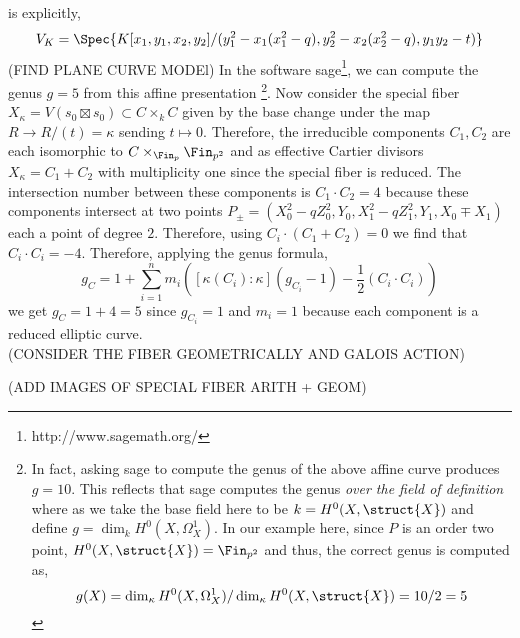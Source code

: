 is explicitly,
\[ V_K = \Spec{K[x_1, y_1, x_2, y_2]/(y_1^2 - x_1(x_1^2 - q), y_2^2 - x_2(x_2^2 - q), y_1 y_2 - t)} \]
(FIND PLANE CURVE MODEl)
In the software sage\footnote{http://www.sagemath.org/}, we can compute the genus $g = 5$ from this affine presentation \footnote{In fact, asking sage to compute the genus of the above affine curve produces $g = 10$. This reflects that sage computes the genus \textit{over the field of definition} where as we take the base field here to be $k = H^0(X, \struct{X})$ and define $g = \dim_k H^0(X, \Omega^1_X)$. In our example here, since $P$ is an order two point, $H^0(X, \struct{X}) = \Fin_{p^2}$ and thus, the correct genus is computed as,
\[ g(X) = \dim_\kappa H^0(X, \Omega^1_X) / \dim_\kappa H^0(X, \struct{X}) = 10/2 = 5 \]}.
Now consider the special fiber $X_\kappa = V(s_0 \boxtimes s_0) \subset C \times_k C$ given by the base change under the map $R \to R/(t) = \kappa$ sending $t \mapsto 0$. Therefore, the irreducible components $C_1, C_2$ are each isomorphic to $C \times_{\Fin_p} \Fin_{p^2}$ and as effective Cartier divisors $X_\kappa = C_1 + C_2$ with multiplicity one since the special fiber is reduced. The intersection number between these components is $C_1 \cdot C_2 = 4$ because these components intersect at two points $P_{\pm} = (X_0^2 - q Z_0^2, Y_0, X_1^2 - q Z_1^2, Y_1, X_0 \mp X_1)$ each a point of degree $2$. Therefore, using $C_i \cdot (C_1 + C_2) = 0$ we find that $C_i \cdot C_i = -4$. Therefore, applying the genus formula,
\[ g_C = 1 + \sum_{i = 1}^n m_i \left( [\kappa(C_i) : \kappa] (g_{C_i} - 1) - \frac{1}{2} (C_i \cdot C_i) \right) \]
we get $g_C = 1 + 4 = 5$ since $g_{C_i} = 1$ and $m_i = 1$ because each component is a reduced elliptic curve. 
\bigskip\\
(CONSIDER THE FIBER GEOMETRICALLY AND GALOIS ACTION)

(ADD IMAGES OF SPECIAL FIBER ARITH + GEOM)
